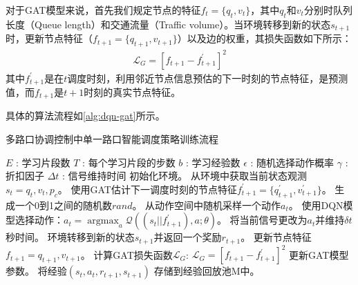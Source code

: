 对于GAT模型来说，首先我们规定节点的特征$f_t=\{q_t, v_t\}$，其中$q_t$和$v_t$分别时队列长度（Queue length）和交通流量（Traffic volume）。当环境转移到新的状态$s_{t+1}$时，更新节点特征（$f_{t+1}=\{q_{t+1},v_{t+1}\}$）以及边的权重，其损失函数如下所示：
\begin{align}
  \label{eq:loss-gat}
  \mathcal{L}_G = [f_{t+1} - f_{t+1}^{\prime}]^2
\end{align}
其中$f_{t+1}^{\prime}$是在$t$调度时刻，利用邻近节点信息预估的下一时刻的节点特征，是预测值，而$f_{t+1}$是$t+1$时刻的真实节点特征。

具体的算法流程如\autoref{alg:dqn-gat}所示。
\begin{breakablealgorithm}
  \caption{多路口协调控制中单一路口智能调度策略训练流程}
  \label{alg:dqn-gat}
  \begin{algorithmic}[1] %
      \Require 
      $E$ : 学习片段数 \newline
      $T$ : 每个学习片段的步数 \newline
      $b$ : 学习经验数 \newline
      $\epsilon$ : 随机选择动作概率 \newline
      $\gamma$ : 折扣因子 \newline
      $\Delta t$ : 信号维持时间
          \State 初始化环境。
              \State 从环境中获取当前状态观测$s_t={q_t, v_t, p_c}$。
              \State 使用GAT估计下一调度时刻的节点特征$f_{t+1}^{\prime}=\{q_{t+1}^{\prime},v_{t+1}^{\prime}\}$。
              \State 生成一个0到1之间的随机数$rand$。
                  \State 从动作空间中随机采样一个动作$a_t$。
              \Else
                  \State 使用DQN模型选择动作：$a_t = \mathop{\arg\max}_a \mathcal{Q}((s_t||f_{t+1}^{\prime}),a;\theta)$。
              \EndIf
              \State 将当前信号更改为$a_t$并维持$\delta t$秒时间。
              \State 环境转移到新的状态$s_{t+1}$并返回一个奖励$r_{t+1}$。
              \State 更新节点特征$f_{t+1}={q_{t+1}, v_{t+1}}$。
              \State 计算GAT损失函数$\mathcal{L}_G$:
              $\mathcal{L}_G = [f_{t+1} - f_{t+1}^{\prime}]^2$
              \State 更新GAT模型参数。
              \State 将经验$(s_t,a_t,r_{t+1},s_{t+1})$ 存储到经验回放池M中。
              \EndIf
          \EndFor
      \EndFor  
  \end{algorithmic}  
\end{breakablealgorithm}  

